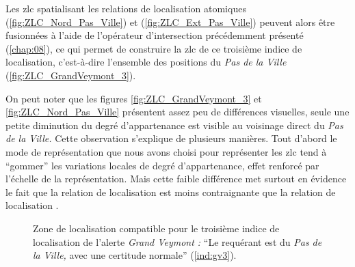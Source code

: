 Les \ac{zlc} spatialisant les relations de localisation atomiques
 (\autoref{fig:ZLC_Nord_Pas_Ville}) et
(\autoref{fig:ZLC_Ext_Pas_Ville}) peuvent alors être fusionnées à
l'aide de l'opérateur d'intersection précédemment présenté
(\autoref{chap:08}), ce qui permet de construire la \ac{zlc} de ce
troisième indice de localisation, c'est-à-dire l'ensemble des
positions  du \emph{Pas de la Ville}
(\autoref{fig:ZLC_GrandVeymont_3}).

On peut noter que les figures \autoref{fig:ZLC_GrandVeymont_3} et
\autoref{fig:ZLC_Nord_Pas_Ville} présentent assez peu de différences
visuelles, seule une petite diminution du degré d'appartenance est
visible au voisinage direct du \emph{Pas de la Ville.} Cette
observation s'explique de plusieurs manières. Tout d'abord le mode de
représentation que nous avons choisi pour représenter les \ac{zlc}
tend à \enquote{gommer} les variations locales de degré
d'appartenance, effet renforcé par l'échelle de la
représentation. Mais cette faible différence met surtout en évidence
le fait que la relation de localisation
 est moins contraignante que
la relation de localisation .

\begin{figure}
  \centering
  
  \caption{Zone de localisation compatible pour le troisième indice de
    localisation de l'alerte \emph{Grand Veymont :} \enquote{Le
      requérant est \protect{} du
      \emph{Pas de la Ville,} avec une certitude normale}
    (\ref{ind:gv3}).}
  \label{fig:ZLC_GrandVeymont_3}
\end{figure}









